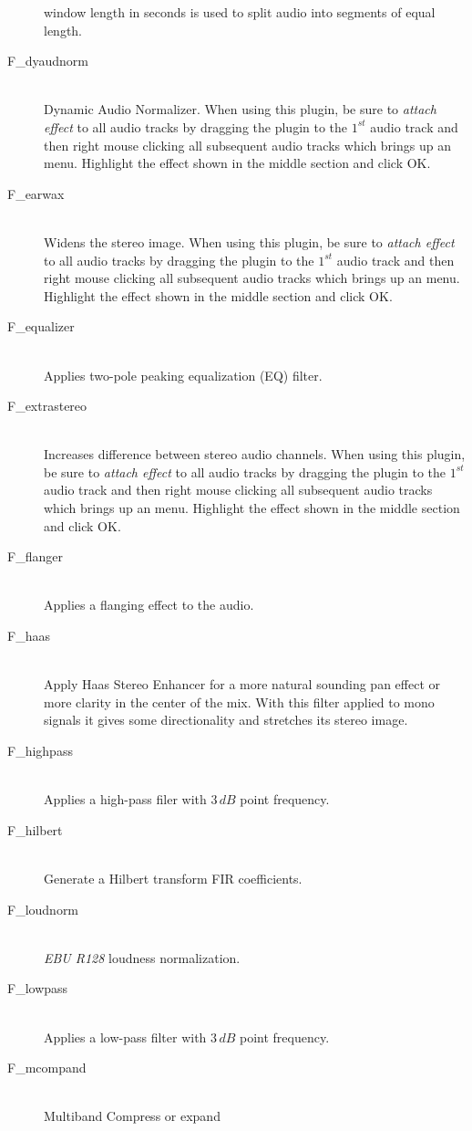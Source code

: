 \begin{description}
  window length in seconds is used to split audio into segments of
  equal length.
\item [F\_dyaudnorm]~\\Dynamic Audio Normalizer. When using
  this plugin, be sure to \textit{attach effect} to all audio tracks
  by dragging the plugin to the $1^{st}$ audio track and then right
  mouse clicking all subsequent audio tracks which brings up an
  menu. Highlight the effect shown in the middle section and click OK.
\item [F\_earwax]~\\Widens the stereo image. When using this
  plugin, be sure to \textit{attach effect} to all audio tracks by
  dragging the plugin to the $1^{st}$ audio track and then right mouse
  clicking all subsequent audio tracks which brings up an
  menu. Highlight the effect shown in the middle section and click OK.
\item [F\_equalizer]~\\Applies two-pole peaking equalization
  (EQ) filter.
\item [F\_extrastereo]~\\Increases difference between stereo
  audio channels. When using this plugin, be sure to \textit{attach
    effect} to all audio tracks by dragging the plugin to the $1^{st}$
  audio track and then right mouse clicking all subsequent audio
  tracks which brings up an menu. Highlight the effect shown in the
  middle section and click OK.
\item [F\_flanger]~\\Applies a flanging effect to the audio.
\item [F\_haas]~\\Apply Haas Stereo Enhancer for a more
  natural sounding pan effect or more clarity in the center of the
  mix. With this filter applied to mono signals it gives some
  directionality and stretches its stereo image.
\item [F\_highpass]~\\Applies a high-pass filer with $3\,dB$
  point frequency.
\item [F\_hilbert]~\\Generate a Hilbert transform FIR
  coefficients.
\item [F\_loudnorm]~\\\textit{EBU R128} loudness
  normalization.
\item [F\_lowpass]~\\Applies a low-pass filter with $3\,dB$
  point frequency.
\item [F\_mcompand]~\\Multiband Compress or expand

\end{description}
